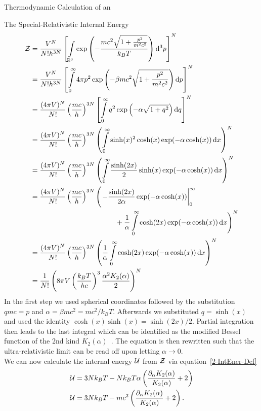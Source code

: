 \begin{section}{Thermodynamic Calculation of an \texorpdfstring{}{EoS}}
\begin{subsection}{The Special-Relativistic Internal Energy}
\begin{align}
	\Z 	&= \frac{V^N}{N!h^{3N}}\left[\int\limits_{\R^3}\exp\left(- \frac{mc^2\sqrt{1+\frac{p^2}{m^2 c^2}}}{k_B T}\right)\diff^3 p\right]^N\label{2-IntEner-EQ1}\\
		&= \frac{V^N}{N!h^{3N}}\left[\int\limits_0^\infty 4\pi p^2\exp\left(-\beta mc^2\sqrt{1+\frac{p^2}{m^2 c^2}} \right)\diff p\right]^N\\
		&= \frac{(4\pi V)^N}{N!}\left(\frac{mc}{h}\right)^{3N}\left[\int\limits_0^\infty q^2\exp\left(-\alpha\sqrt{1+q^2}\right)\diff q\right]^N\\
		&= \frac{(4\pi V)^N}{N!}\left(\frac{mc}{h}\right)^{3N}\left(\int\limits_0^\infty\sinh(x)^2\cosh(x)\exp(-\alpha\cosh(x))\diff x \right)^N\\
		&= \frac{(4\pi V)^N}{N!}\left(\frac{mc}{h}\right)^{3N}\left(\int\limits_0^\infty\frac{\sinh(2x)}{2}\sinh(x)\exp(-\alpha\cosh(x))\diff x \right)^N\\
		&= \frac{(4\pi V)^N}{N!}\left(\frac{mc}{h}\right)^{3N}\Biggl(\left.-\frac{\sinh(2x)}{2\alpha}\exp(-\alpha\cosh(x))\right|_0^\infty\\
		&\hspace{12em} + \frac{1}{\alpha}\int\limits_0^\infty\cosh(2x)\exp(-\alpha\cosh(x))\diff x  \Biggr)^N\\
		&= \frac{(4\pi V)^N}{N!}\left(\frac{mc}{h}\right)^{3N}\left(\frac{1}{\alpha}\int\limits_0^\infty\cosh(2x)\exp(-\alpha\cosh(x))\diff x  \right)^N\\
		&= \frac{1}{N!}\left(8\pi V\left(\frac{k_B T}{hc}\right)^{3}\frac{\alpha^2 K_2(\alpha)}{2}\right)^N
		\label{2-IntEner-PartFunc}
\end{align}
In the first step we used spherical coordinates followed by the substitution $qmc=p$ and $\alpha=\beta mc^2=mc^2/k_B T$.
Afterwards we substituted $q=\sinh(x)$ and used the identity $\cosh(x)\sinh(x)=\sinh(2x)/2$.
Partial integration then leads to the last integral which can be identified as the modified Bessel function of the 2nd kind $K_2(\alpha)$~\cite{abramowitzPocketbookMathematicalFunctions1984}.
The equation is then rewritten such that the ultra-relativistic limit can be read off upon letting $\alpha\rightarrow0$.\\
We can now calculate the internal energy $\mathcal{U}$ from $\mathcal{Z}$ via equation~\eqref{2-IntEner-Def}
\begin{align}
    \U &= 3Nk_B T - Nk_B T\alpha\left(\frac{\partial_\alpha K_2(\alpha)}{K_2(\alpha)}+2\right)\\
    \U &= 3Nk_B T - mc^2\left(\frac{\partial_\alpha K_2(\alpha)}{K_2(\alpha)}+2\right).
    \label{2-IntEner-InternelEnergyExplicit}

\end{align}
\end{subsection}
\end{section}
